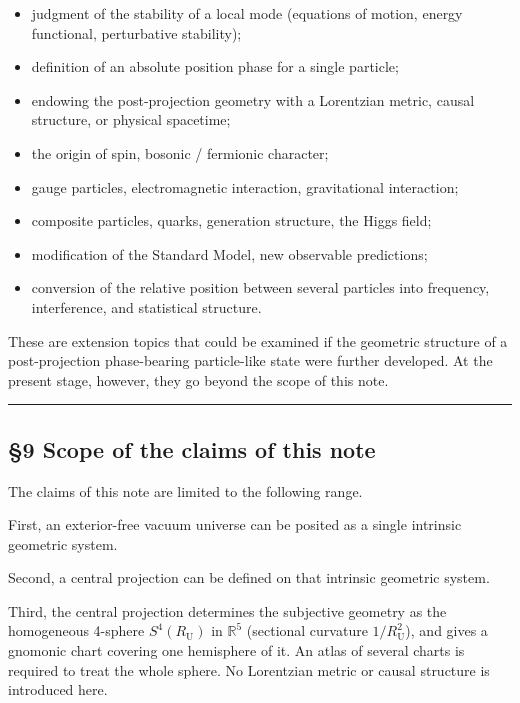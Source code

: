 \documentclass[
]{article}
\providecommand{\tightlist}{%
  \setlength{\itemsep}{0pt}\setlength{\parskip}{0pt}}
\begin{document}
\begin{itemize}
\tightlist
\item
  judgment of the stability of a local mode (equations of motion, energy
  functional, perturbative stability);
\item
  definition of an absolute position phase for a single particle;
\item
  endowing the post-projection geometry with a Lorentzian metric, causal
  structure, or physical spacetime;
\item
  the origin of spin, bosonic / fermionic character;
\item
  gauge particles, electromagnetic interaction, gravitational
  interaction;
\item
  composite particles, quarks, generation structure, the Higgs field;
\item
  modification of the Standard Model, new observable predictions;
\item
  conversion of the relative position between several particles into
  frequency, interference, and statistical structure.
\end{itemize}

These are extension topics that could be examined if the geometric
structure of a post-projection phase-bearing particle-like state were
further developed. At the present stage, however, they go beyond the
scope of this note.

\begin{center}\rule{0.5\linewidth}{0.5pt}\end{center}

\subsection{§9 Scope of the claims of this
note}\label{scope-of-the-claims-of-this-note}

The claims of this note are limited to the following range.

First, an exterior-free vacuum universe can be posited as a single
intrinsic geometric system.

Second, a central projection can be defined on that intrinsic geometric
system.

Third, the central projection determines the subjective geometry as the
homogeneous 4-sphere \(S^4(R_{\mathrm U})\) in \(\mathbb{R}^5\)
(sectional curvature \(1/R_{\mathrm U}^2\)), and gives a gnomonic chart
covering one hemisphere of it. An atlas of several charts is required to
treat the whole sphere. No Lorentzian metric or causal structure is
introduced here.
\end{document}
